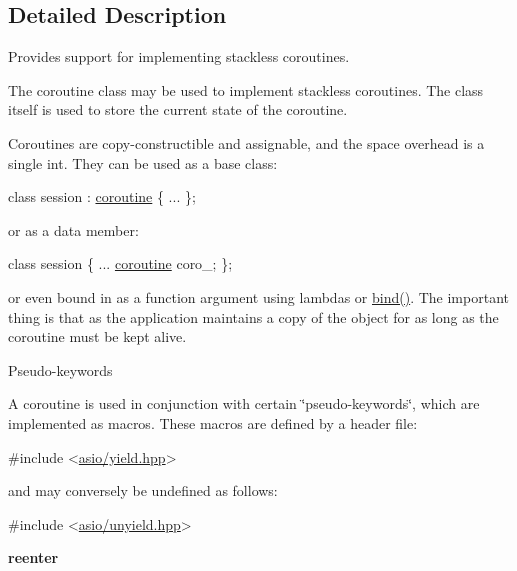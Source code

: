 \subsection{Detailed Description}
Provides support for implementing stackless coroutines. 

The {\ttfamily coroutine} class may be used to implement stackless coroutines. The class itself is used to store the current state of the coroutine.

Coroutines are copy-\/constructible and assignable, and the space overhead is a single int. They can be used as a base class\+:


\begin{DoxyCode}
 \textcolor{keyword}{class }session : \hyperlink{classasio_1_1coroutine_aae689a0aee08699c9d68bdc9d246b5cb}{coroutine}
\{
  ...
\}; 
\end{DoxyCode}


or as a data member\+:


\begin{DoxyCode}
 \textcolor{keyword}{class }session
\{
  ...
  \hyperlink{classasio_1_1coroutine_aae689a0aee08699c9d68bdc9d246b5cb}{coroutine} coro\_;
\}; 
\end{DoxyCode}


or even bound in as a function argument using lambdas or {\ttfamily \hyperlink{namespaceasio_1_1detail_1_1socket__ops_a86014a1273549d66157c6e4dd9532f86}{bind()}}. The important thing is that as the application maintains a copy of the object for as long as the coroutine must be kept alive.

\begin{DoxyParagraph}{Pseudo-\/keywords}

\end{DoxyParagraph}
A coroutine is used in conjunction with certain \char`\"{}pseudo-\/keywords\char`\"{}, which are implemented as macros. These macros are defined by a header file\+:


\begin{DoxyCode}
\textcolor{preprocessor}{#include <\hyperlink{yield_8hpp}{asio/yield.hpp}>}
\end{DoxyCode}


and may conversely be undefined as follows\+:


\begin{DoxyCode}
\textcolor{preprocessor}{#include <\hyperlink{unyield_8hpp}{asio/unyield.hpp}>}
\end{DoxyCode}


{\bfseries reenter}

